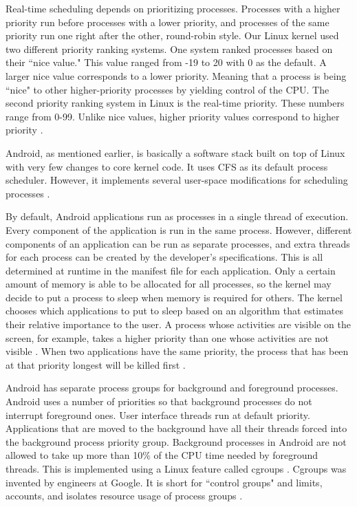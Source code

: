 \documentclass[letterpaper,10pt,titlepage]{article}
\newcommand{\tab}{\hspace*{2em}} %
\begin{document}
\tab Real-time scheduling depends on prioritizing processes. Processes with a higher priority run before processes with a lower priority, and processes of the same priority run one right after the other, round-robin style. Our Linux kernel used two different priority ranking systems. One system ranked processes based on their ``nice value." This value ranged from -19 to 20 with 0 as the default. A larger nice value corresponds to a lower priority. Meaning that a process is being ``nice" to other higher-priority processes by yielding control of the CPU. The second priority ranking system in Linux is the real-time priority. These numbers range from 0-99. Unlike nice values, higher priority values correspond to higher priority \cite{Love}.

\tab Android, as mentioned earlier, is basically a software stack built on top of Linux with very few changes to core kernel code. It uses CFS as its default process scheduler. However, it implements several user-space modifications for scheduling processes \cite{Optimus}.

\tab By default, Android applications run as processes in a single thread of execution. Every component of the application is run in the same process. However, different components of an application can be run as separate processes, and extra threads for each process can be created by the developer's specifications. This is all determined at runtime in the manifest file for each application. Only a certain amount of memory is able to be allocated for all processes, so the kernel may decide to put a process to sleep when memory is required for others. The kernel chooses which applications to put to sleep based on an algorithm that estimates their relative importance to the user. A process whose activities are visible on the screen, for example, takes a higher priority than one whose activities are not visible \cite{AndroidDev1}. When two applications have the same priority, the process that has been at that priority longest will be killed first \cite{SO1}.

\tab Android has separate process groups for background and foreground processes. Android uses a number of priorities so that background processes do not interrupt foreground ones. User interface threads run at default priority. Applications that are moved to the background have all their threads forced into the background process priority group. Background processes in Android are not allowed to take up more than 10\% of the CPU time needed by foreground threads. This is implemented using a Linux feature called cgroups \cite{Hackborn}. Cgroups was invented by engineers at Google. It is short for ``control groups" and limits, accounts, and isolates resource usage of process groups \cite{cgroups}.
\end{document}

